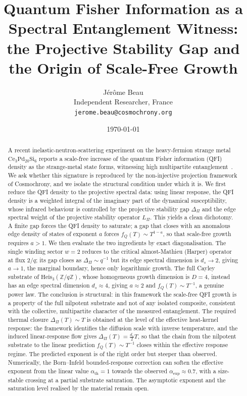 \documentclass[11pt]{article}
\title{\textbf{Quantum Fisher Information as a Spectral Entanglement Witness:\\
the Projective Stability Gap and the Origin of Scale-Free Growth}}
\author{J\'er\^ome Beau\\
\small Independent Researcher, France\\
\small \texttt{jerome.beau@cosmochrony.org}}
\date{\today}
\newcommand{\Heis}{\mathrm{Heis}_3(\mathbb{Z}/q\mathbb{Z})}
\newcommand{\DPi}{\Delta_\Pi}
\newcommand{\fQ}{f_Q}
\newcommand{\Lap}{L_\Pi}
\begin{document}
\maketitle

\begin{abstract}
A recent inelastic-neutron-scattering experiment on the heavy-fermion strange metal
$\mathrm{Ce}_3\mathrm{Pd}_{20}\mathrm{Si}_6$ reports a scale-free increase of the quantum Fisher information (QFI)
density as the strange-metal state forms, witnessing high multipartite entanglement~\cite{Mazza2026}.
We ask whether this signature is reproduced by the non-injective projection framework of Cosmochrony, and we
isolate the structural condition under which it is.
We first reduce the QFI density to the projective spectral data:
using linear response, the QFI density is a weighted integral of the imaginary part of the dynamical
susceptibility, whose infrared behaviour is controlled by the projective stability gap $\DPi$ and the edge
spectral weight of the projective stability operator $\Lap$.
This yields a clean dichotomy.
A finite gap forces the QFI density to saturate; a gap that closes with an anomalous edge density of states of
exponent $a$ forces $\fQ(T)\sim T^{1-a}$, so that scale-free growth requires $a>1$.
We then evaluate the two ingredients by exact diagonalisation.
The single winding sector $w=2$ reduces to the critical almost-Mathieu (Harper) operator at flux $2/q$;
its gap closes as $\DPi\sim q^{-1}$ but its edge spectral dimension is $d_s\to 2$, giving $a\to 1$, the marginal
boundary, hence only logarithmic growth.
The full Cayley substrate of $\Heis$, whose homogeneous growth dimension is $D=4$, instead has an edge spectral
dimension $d_s\approx 4$, giving $a\approx 2$ and $\fQ(T)\sim T^{-1}$, a genuine power law.
The conclusion is structural: in this framework the scale-free QFI growth is a property of the full nilpotent
substrate and not of any isolated composite, consistent with the collective, multipartite character of the
measured entanglement.
The required thermal closure $\DPi(T)\sim T$ is obtained at the level of the effective heat-kernel response: the
framework identifies the diffusion scale with inverse temperature, and the induced linear-response flow gives
$\DPi(T)=\tfrac{d_s}{2}T$, so that the chain from the nilpotent substrate to the linear prediction
$\fQ(T)\sim T^{-1}$ closes within the effective response regime.
The predicted exponent is of the right order but steeper than observed.
Numerically, the Born--Infeld bounded-response correction can soften the effective exponent from the linear value
$\alpha_{\mathrm{th}}=1$ towards the observed $\alpha_{\mathrm{exp}}\approx 0.7$, with a size-stable crossing at a
partial substrate saturation.
The asymptotic exponent and the saturation level realised by the material remain open.
\end{abstract}
\end{document}

